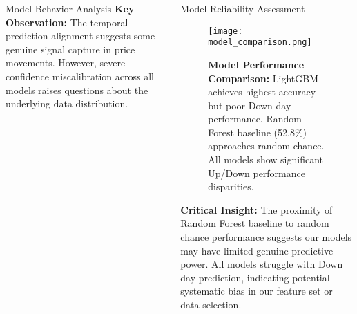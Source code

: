 \documentclass[final]{beamer}
\begin{document}
\begin{frame}[t]
\begin{columns}[T]
\begin{column}{0.48\linewidth}
\begin{block}{Model Behavior Analysis}
        \textbf{Key Observation:} The temporal prediction alignment suggests some genuine signal capture in price movements. However, severe confidence miscalibration across all models raises questions about the underlying data distribution.
    \end{block}
\end{column}

\begin{column}{0.5\linewidth}
    \begin{block}{Model Reliability Assessment}
        \begin{figure}
            \centering
            \texttt{[image: model\_comparison.png]}
            \caption{\small\textbf{Model Performance Comparison:} LightGBM achieves highest accuracy but poor Down day performance. Random Forest baseline (52.8\%) approaches random chance. All models show significant Up/Down performance disparities.}
        \end{figure}
        
        \textbf{Critical Insight:} The proximity of Random Forest baseline to random chance performance suggests our models may have limited genuine predictive power. All models struggle with Down day prediction, indicating potential systematic bias in our feature set or data selection.
    \end{block}
\end{column}
\end{columns}


\end{frame}
\end{document}

